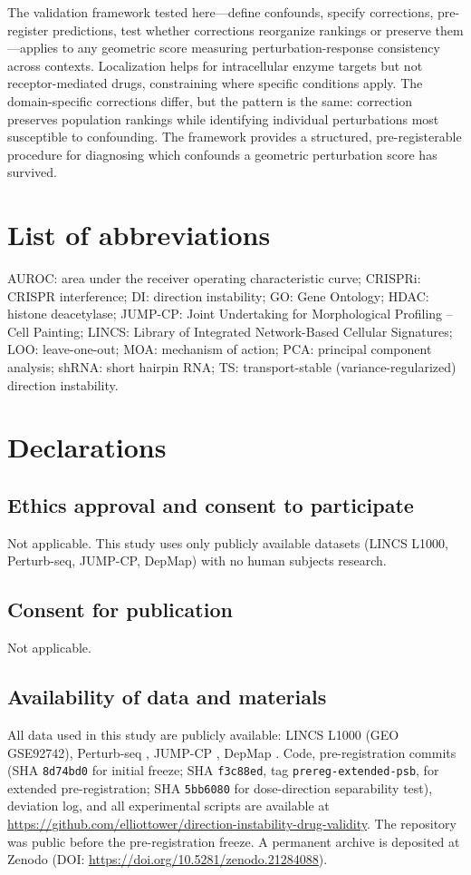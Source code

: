 \documentclass[11pt]{article}
\begin{document}
The validation framework tested here---define confounds, specify
corrections, pre-register predictions, test whether corrections reorganize
rankings or preserve them---applies to any geometric score measuring
perturbation-response consistency across contexts. Localization helps for
intracellular enzyme targets but not receptor-mediated drugs, constraining
where specific conditions apply. The domain-specific corrections differ,
but the pattern is the same: correction preserves population rankings while
identifying individual perturbations most susceptible to confounding. The
framework provides a structured, pre-registerable procedure for diagnosing
which confounds a geometric perturbation score has survived.

\section*{List of abbreviations}
AUROC: area under the receiver operating characteristic curve;
CRISPRi: CRISPR interference;
DI: direction instability;
GO: Gene Ontology;
HDAC: histone deacetylase;
JUMP-CP: Joint Undertaking for Morphological Profiling -- Cell Painting;
LINCS: Library of Integrated Network-Based Cellular Signatures;
LOO: leave-one-out;
MOA: mechanism of action;
PCA: principal component analysis;
shRNA: short hairpin RNA;
TS: transport-stable (variance-regularized) direction instability.

\section*{Declarations}

\subsection*{Ethics approval and consent to participate}
Not applicable. This study uses only publicly available datasets
(LINCS L1000, Perturb-seq, JUMP-CP, DepMap) with no human subjects
research.

\subsection*{Consent for publication}
Not applicable.

\subsection*{Availability of data and materials}
All data used in this study are publicly available: LINCS L1000
(GEO GSE92742), Perturb-seq \citep{replogle2022mapping}, JUMP-CP
\citep{chandrasekaran2023jump}, DepMap \citep{dempster2021chronos}.
Code, pre-registration commits (SHA \texttt{8d74bd0} for initial
freeze; SHA \texttt{f3c88ed}, tag \texttt{prereg-extended-psb}, for
extended pre-registration; SHA \texttt{5bb6080} for dose-direction
separability test), deviation log, and all experimental scripts are
available at
\url{https://github.com/elliottower/direction-instability-drug-validity}.
The repository was public before the pre-registration freeze.
A permanent archive is deposited at Zenodo
(DOI: \url{https://doi.org/10.5281/zenodo.21284088}).
\end{document}
